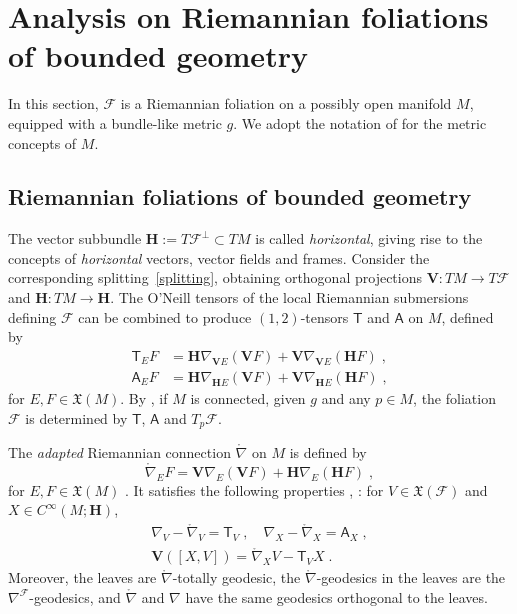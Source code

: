 \documentclass{memo-l}
\theoremstyle{plain}
\theoremstyle{definition}
\theoremstyle{remark}
\newcommand{\FF}{\mathcal{F}}
\newcommand{\fX}{\mathfrak{X}}
\newcommand{\bfH}{\boldsymbol{H}}
\newcommand{\bfV}{\boldsymbol{V}}
\newcommand{\sA}{\mathsf{A}}
\newcommand{\sT}{\mathsf{T}}
\newcommand{\rnabla}{\mathring{\nabla}}
\numberwithin{section}{chapter}
\numberwithin{equation}{section}%
\begin{document}
\section{Analysis on Riemannian foliations of bounded geometry}\label{s: analysis on Riem folns}

In this section, $\FF$ is a Riemannian foliation on a possibly open manifold $M$, equipped with a bundle-like metric $g$. We adopt the notation of  for the metric concepts of $M$. 

\subsection{Riemannian foliations of bounded geometry}\label{ss: transverse structures of bd geometry}

The vector subbundle $\bfH:=T\FF^\perp\subset TM$ is called \emph{horizontal}, giving rise to the concepts of \emph{horizontal} vectors, vector fields and frames. Consider the corresponding splitting~\eqref{splitting}, obtaining orthogonal projections $\bfV:TM\to T\FF$ and $\bfH:TM\to\bfH$. The O'Neill tensors \cite{ONeill1966} of the local Riemannian submersions defining $\FF$ can be combined to produce $(1,2)$-tensors $\sT$\index{$\sT$} and $\sA$\index{$\sA$} on $M$, defined by
\begin{align*}
\sT_EF&=\bfH\nabla_{\bfV E}(\bfV F)+\bfV\nabla_{\bfV E}(\bfH F)\;,\\
\sA_EF&=\bfH\nabla_{\bfH E}(\bfV F)+\bfV\nabla_{\bfH E}(\bfH F)\;,
\end{align*}
for $E,F\in\fX(M)$.  By \cite[Theorem~4]{ONeill1966}, if $M$ is connected, given $g$ and any $p\in M$, the foliation $\FF$ is determined by $\sT$, $\sA$ and $T_p\FF$. 

The \emph{adapted} Riemannian connection $\rnabla$\index{$\rnabla$} on $M$ is defined by
\[
\rnabla_EF=\bfV\nabla_E(\bfV F)+\bfH\nabla_E(\bfH F)\;,
\]
for $E,F\in\fX(M)$ \cite{AlvTond1991}. It satisfies the following properties \cite[Section~3]{AlvKordyLeichtnam2014}, \cite[Section~5]{AlvKordyLeichtnam2020}: for $V\in\fX(\FF)$ and $X\in C^\infty(M;\bfH)$,
\begin{gather}
\nabla_V-\rnabla_V=\sT_V\;,\quad\nabla_X-\rnabla_X=\sA_X\;,\label{nabla-rnabla}\\
\bfV([X,V])=\rnabla_XV-\sT_VX\;.\label{bV[X,V]}
\end{gather} 
Moreover, the leaves are $\rnabla$-totally geodesic, the $\rnabla$-geodesics in the leaves are the $\nabla^\FF$-geodesics, and $\rnabla$ and $\nabla$ have the same geodesics orthogonal to the leaves.
\end{document}
